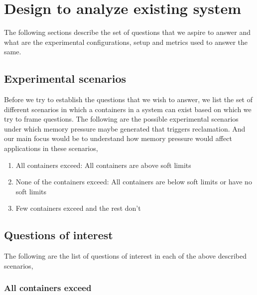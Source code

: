 
\chapter{Design to analyze existing system}

  The following sections describe the set of questions that we aspire to answer and what are the experimental configurations, setup and 
metrics used to answer the same. 

  \section{Experimental scenarios}
    
    Before we try to establish the questions that we wish to answer, we list the set of different scenarios in which a containers in a 
system can exist based on which we try to frame questions. The following are the possible experimental scenarios under which memory 
pressure maybe generated that triggers reclamation. And our main focus would be to understand how memory pressure would affect applications 
in these scenarios,

    \begin{enumerate}
      \item All containers exceed: All containers are above soft limits
      \item None of the containers exceed: All containers are below soft limits or have no soft limits
      \item Few containers exceed and the rest don't
    \end{enumerate}
  
  \section{Questions of interest}
    \label{section_questions}
  
    The following are the list of questions of interest in each of the above described scenarios,
    
    \subsection{All containers exceed}
      
